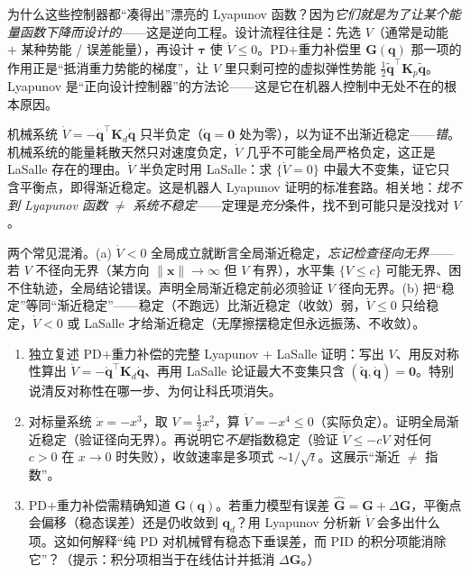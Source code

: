 \begin{insight}
为什么这些控制器都“凑得出”漂亮的 Lyapunov 函数？因为\emph{它们就是为了让某个能量函数下降而设计的}——这是逆向工程。设计流程往往是：先选 $V$（通常是动能 $+$ 某种势能 / 误差能量），再设计 $\boldsymbol{\tau}$ 使 $\dot V\le0$。PD$+$重力补偿里 $\mathbf{G}(\mathbf{q})$ 那一项的作用正是“抵消重力势能的梯度”，让 $V$ 里只剩可控的虚拟弹性势能 $\tfrac12\tilde{\mathbf{q}}^\top\mathbf{K}_p\tilde{\mathbf{q}}$。Lyapunov 是“正向设计控制器”的方法论——这是它在机器人控制中无处不在的根本原因。
\end{insight}

\begin{pitfall}
机械系统 $\dot V=-\dot{\mathbf{q}}^\top\mathbf{K}_d\dot{\mathbf{q}}$ 只半负定（$\dot{\mathbf{q}}=\mathbf{0}$ 处为零），以为证不出渐近稳定——\emph{错}。机械系统的能量耗散天然只对速度负定，$\dot V$ 几乎不可能全局严格负定，这正是 LaSalle 存在的理由。$\dot V$ 半负定时用 LaSalle：求 $\{\dot V=0\}$ 中最大不变集，证它只含平衡点，即得渐近稳定。这是机器人 Lyapunov 证明的标准套路。相关地：\emph{找不到 Lyapunov 函数 $\neq$ 系统不稳定}——定理是\emph{充分}条件，找不到可能只是没找对 $V$。
\end{pitfall}

\begin{pitfall}
两个常见混淆。(a) $\dot V<0$ 全局成立就断言全局渐近稳定，\emph{忘记检查径向无界}——若 $V$ 不径向无界（某方向 $\|\mathbf{x}\|\to\infty$ 但 $V$ 有界），水平集 $\{V\le c\}$ 可能无界、困不住轨迹，全局结论错误。声明全局渐近稳定前必须验证 $V$ 径向无界。(b) 把“稳定”等同“渐近稳定”——稳定（不跑远）比渐近稳定（收敛）弱，$\dot V\le0$ 只给稳定，$\dot V<0$ 或 LaSalle 才给渐近稳定（无摩擦摆稳定但永远振荡、不收敛）。
\end{pitfall}

\begin{practice}
\begin{enumerate}
  \item 独立复述 PD$+$重力补偿的完整 Lyapunov $+$ LaSalle 证明：写出 $V$、用反对称性算出 $\dot V=-\dot{\mathbf{q}}^\top\mathbf{K}_d\dot{\mathbf{q}}$、再用 LaSalle 论证最大不变集只含 $(\tilde{\mathbf{q}},\dot{\mathbf{q}})=\mathbf{0}$。特别说清反对称性在哪一步、为何让科氏项消失。
  \item 对标量系统 $\dot x=-x^3$，取 $V=\tfrac12 x^2$，算 $\dot V=-x^4\le0$（实际负定）。证明全局渐近稳定（验证径向无界）。再说明它\emph{不是}指数稳定（验证 $\dot V\le-cV$ 对任何 $c>0$ 在 $x\to0$ 时失败），收敛速率是多项式 $\sim1/\sqrt t$。这展示“渐近 $\neq$ 指数”。
  \item PD$+$重力补偿需精确知道 $\mathbf{G}(\mathbf{q})$。若重力模型有误差 $\hat{\mathbf{G}}=\mathbf{G}+\Delta\mathbf{G}$，平衡点会偏移（稳态误差）还是仍收敛到 $\mathbf{q}_d$？用 Lyapunov 分析新 $\dot V$ 会多出什么项。这如何解释“纯 PD 对机械臂有稳态下垂误差，而 PID 的积分项能消除它”？（提示：积分项相当于在线估计并抵消 $\Delta\mathbf{G}$。）
\end{enumerate}
\end{practice}

